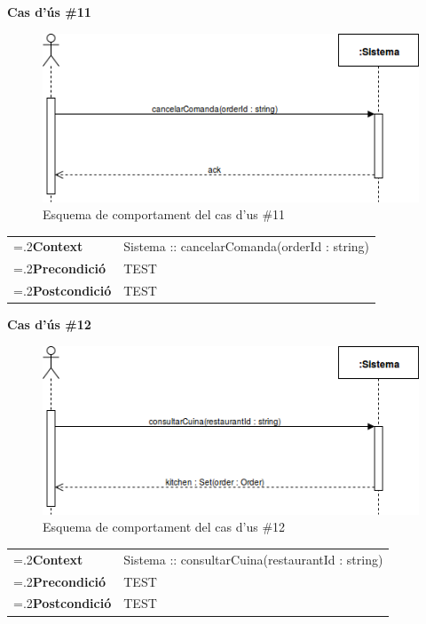 \clearpage
\noindent\textbf{\large Cas d'ús \#11}\\
\begin{figure}[H]
\centering
\includegraphics[scale=0.6]{Figures/casdus_11.png}
\caption{Esquema de comportament del cas d'us \#11}
\end{figure}
\begin{table}[h]
\noindent
\begin{tabularx}{\linewidth}{
>{\hsize=.2\hsize}X%
>{\hsize=0.8\hsize}X%
}
\textbf{Context} 		& Sistema :: cancelarComanda(orderId : string) \\
\textbf{Precondició} 	& TEST \\
\textbf{Postcondició}	& TEST \\
\end{tabularx}
\label{}
\end{table}

\noindent\textbf{\large Cas d'ús \#12}\\
\begin{figure}[H]
\centering
\includegraphics[scale=0.6]{Figures/casdus_12.png}
\caption{Esquema de comportament del cas d'us \#12}
\end{figure}
\begin{table}[h]
\noindent
\begin{tabularx}{\linewidth}{
>{\hsize=.2\hsize}X%
>{\hsize=0.8\hsize}X%
}
\textbf{Context} 		& Sistema :: consultarCuina(restaurantId : string) \\
\textbf{Precondició} 	& TEST \\
\textbf{Postcondició}	& TEST \\
\end{tabularx}
\label{}
\end{table}

